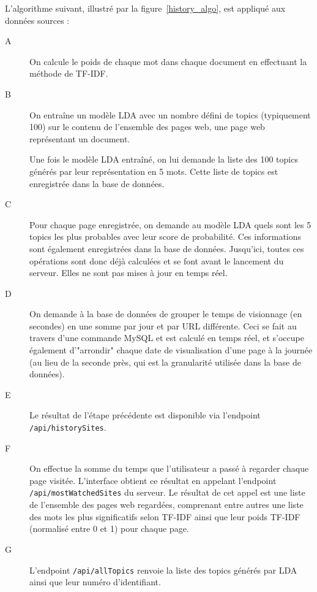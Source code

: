 		L'algorithme suivant, illustré par la figure~\ref{history_algo}, est appliqué aux données sources :
		\begin{description}
			\item[A] On calcule le poids de chaque mot dans chaque document en effectuant la méthode de TF-IDF.

			\item[B] On entraîne un modèle LDA avec un nombre défini de topics (typiquement 100) sur le contenu de l'ensemble des pages web, une page web représentant un document.
			
			Une fois le modèle LDA entraîné, on lui demande la liste des 100 topics générés par leur représentation en 5 mots. Cette liste de topics est enregistrée dans la base de données.

			\item[C] Pour chaque page enregistrée, on demande au modèle LDA quels sont les 5 topics les plus probables avec leur score de probabilité. Ces informations sont également enregistrées dans la base de données. Jusqu'ici, toutes ces opérations sont donc déjà calculées et se font avant le lancement du serveur. Elles ne sont pas mises à jour en temps réel.

			\item[D] On demande à la base de données de grouper le temps de visionnage (en secondes) en une somme par jour et par URL différente. Ceci se fait au travers d'une commande MySQL et est calculé en temps réel, et s'occupe également d'"arrondir" chaque date de visualisation d'une page à la journée (au lieu de la seconde près, qui est la granularité utilisée dans la base de données).

			\item[E] Le résultat de l'étape précédente est disponible via l'endpoint\\
			\texttt{/api/historySites}.

			\item[F] On effectue la somme du temps que l'utilisateur a passé à regarder chaque page visitée. L'interface obtient ce résultat en appelant l'endpoint\\
			\texttt{/api/mostWatchedSites} du serveur. Le résultat de cet appel est une liste de l'ensemble des pages web regardées, comprenant entre autres une liste des mots les plus significatifs selon TF-IDF ainsi que leur poids TF-IDF (normalisé entre 0 et 1) pour chaque page.
			
			\item[G] L'endpoint \texttt{/api/allTopics} renvoie la liste des topics générés par LDA ainsi que leur numéro d'identifiant.


\end{description}
